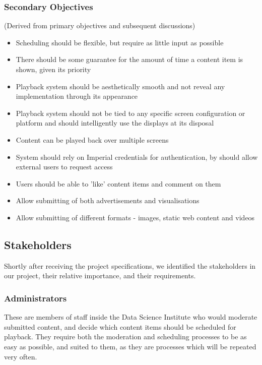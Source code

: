 \documentclass[a4paper, titlepage]{article}
\begin{document}
\subsubsection{Secondary Objectives} \label{sec:secondary_objectives}
(Derived from primary objectives and subsequent discussions)

\begin{itemize}
\item Scheduling should be flexible, but require as little input as possible
\item There should be some guarantee for the amount of time a content item is shown, given its priority
\item Playback system should be aesthetically smooth and not reveal any implementation through its appearance
\item Playback system should not be tied to any specific screen configuration or platform and should intelligently use the displays at its disposal
\item Content can be played back over multiple screens
\item System should rely on Imperial credentials for authentication, by should allow external users to request access
\item Users should be able to 'like' content items and comment on them
\item Allow submitting of both advertisements and visualisations
\item Allow submitting of different formats - images, static web content and videos
\end{itemize}

\subsection{Stakeholders}

Shortly after receiving the project specifications, we identified the stakeholders in our project, their relative importance, and their requirements.

\subsubsection{Administrators}
These are members of staff inside the Data Science Institute who would moderate submitted content, and decide which content items should be scheduled for playback. They require both the moderation and scheduling processes to be as easy as possible, and suited to them, as they are processes which will be repeated very often.
\end{document}
